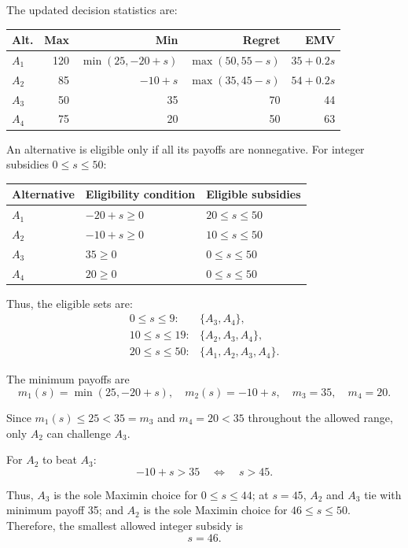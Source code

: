 The updated decision statistics are:

\begin{center}\small\setlength{\tabcolsep}{4pt}
	\begin{tabular}{lrrrr}\toprule
		Alt. & Max & Min & Regret & EMV\\ \midrule
		$A_1$ & 120 & $\min(25,-20+s)$ & $\max(50,55-s)$ & $35+0.2s$\\
		$A_2$ & 85 & $-10+s$ & $\max(35,45-s)$ & $54+0.2s$\\
		$A_3$ & 50 & 35 & 70 & 44\\
		$A_4$ & 75 & 20 & 50 & 63\\
		\bottomrule
	\end{tabular}
\end{center}

An alternative is eligible only if all its payoffs are nonnegative.
For integer subsidies $0\le s\le50$:

\begin{center}
	\begin{tabular}{lll}\toprule
		Alternative & Eligibility condition & Eligible subsidies\\\midrule
		$A_1$ & $-20+s\ge0$ & $20\le s\le50$\\
		$A_2$ & $-10+s\ge0$ & $10\le s\le50$\\
		$A_3$ & $35\ge0$ & $0\le s\le50$\\
		$A_4$ & $20\ge0$ & $0\le s\le50$\\
		\bottomrule
	\end{tabular}
\end{center}

Thus, the eligible sets are:
\[
\begin{array}{ll}
	0\le s\le9: & \{A_3,A_4\},\\
	10\le s\le19: & \{A_2,A_3,A_4\},\\
	20\le s\le50: & \{A_1,A_2,A_3,A_4\}.
\end{array}
\]

The minimum payoffs are
\[
m_1(s)=\min(25,-20+s),\quad
m_2(s)=-10+s,\quad
m_3=35,\quad m_4=20.
\]

Since $m_1(s)\le25<35=m_3$ and $m_4=20<35$ throughout
the allowed range, only $A_2$ can challenge $A_3$.

For $A_2$ to beat $A_3$:
\[
-10+s>35
\quad\Longleftrightarrow\quad s>45.
\]

Thus, $A_3$ is the sole Maximin choice for $0\le s\le44$;
at $s=45$, $A_2$ and $A_3$ tie with minimum payoff 35;
and $A_2$ is the sole Maximin choice for $46\le s\le50$.
Therefore, the smallest allowed integer subsidy is
\[
\boxed{s=46}.
\]


